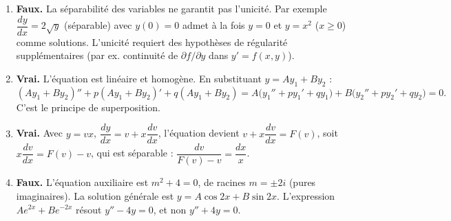 \documentclass[11pt]{article}
\newcommand{\cle}[1]{{\popxbold\color{popdark}#1}}
\begin{document}
\begin{corrige}
\begin{enumerate}
\item \textbf{Faux.} La séparabilité des variables ne garantit pas l'unicité. Par exemple $\dfrac{dy}{dx} = 2\sqrt{y}$ (séparable) avec $y(0) = 0$ admet à la fois $y = 0$ et $y = x^{2}$ ($x \ge 0$) comme solutions. L'unicité requiert des hypothèses de régularité supplémentaires (par ex. continuité de $\partial f/\partial y$ dans $y' = f(x,y)$).
\item \textbf{Vrai.} L'équation est linéaire et homogène. En substituant $y = Ay_{1} + By_{2}$ :
\[ (Ay_1+By_2)'' + p(Ay_1+By_2)' + q(Ay_1+By_2) = A\big(y_1''+py_1'+qy_1\big) + B\big(y_2''+py_2'+qy_2\big) = 0. \]
C'est le \cle{principe de superposition}.
\item \textbf{Vrai.} Avec $y = vx$, $\dfrac{dy}{dx} = v + x\dfrac{dv}{dx}$, l'équation devient $v + x\dfrac{dv}{dx} = F(v)$, soit $x\dfrac{dv}{dx} = F(v) - v$, qui est séparable : $\dfrac{dv}{F(v)-v} = \dfrac{dx}{x}$.
\item \textbf{Faux.} L'équation auxiliaire est $m^{2} + 4 = 0$, de racines $m = \pm 2i$ (pures imaginaires). La solution générale est $y = A\cos 2x + B\sin 2x$. L'expression $Ae^{2x} + Be^{-2x}$ résout $y'' - 4y = 0$, et non $y'' + 4y = 0$.
\end{enumerate}
\end{corrige}
\end{document}
